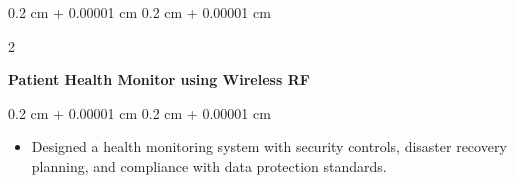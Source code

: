\documentclass[10pt, letterpaper]{article}
\newenvironment{highlights}{
    \begin{itemize}[
        topsep=0.10 cm,
        parsep=0.10 cm,
        partopsep=0pt,
        itemsep=0pt,
        leftmargin=0.4 cm + 10pt
    ]
}{
    \end{itemize}
} %
\newenvironment{onecolentry}{
    \begin{adjustwidth}{
        0.2 cm + 0.00001 cm
    }{
        0.2 cm + 0.00001 cm
    }
}{
    \end{adjustwidth}
} %
\newenvironment{twocolentry}[2][]{
    \onecolentry
    \def\secondColumn{#2}
    \setcolumnwidth{\fill, 4.5 cm}
    \begin{paracol}{2}
}{
    \switchcolumn \raggedleft \secondColumn
    \end{paracol}
    \endonecolentry
} %
\begin{document}
    \vspace{0.2 cm}
    \begin{twocolentry}{}
        \textbf{Patient Health Monitor using Wireless RF}
    \end{twocolentry}
    \vspace{0.10 cm}
    \begin{onecolentry}
        \begin{highlights}
            \item Designed a health monitoring system with security controls, disaster recovery planning, and compliance with data protection standards.
        \end{highlights}
    \end{onecolentry}
\end{document}
